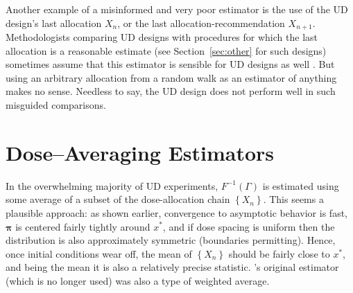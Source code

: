 Another example of a misinformed and very poor estimator is the use of the UD design's last allocation $X_n$, or the last allocation-recommendation $X_{n+1}$.  Methodologists comparing UD designs with procedures for which the last allocation is a reasonable estimate (see Section~\ref{sec:other} for such designs) sometimes assume that this estimator is sensible for UD designs as well \citep{O'Qu:Chev:meth:1991,Zack:stag:2009}. But using an arbitrary allocation from a random walk as an estimator of anything makes no sense. Needless to say, the UD design does not perform well in such misguided comparisons.

\section{Dose--Averaging Estimators}\label{sec:averaging}

In the overwhelming majority of UD experiments, $F^{-1}(\Gamma)$ is estimated using some average of a subset of the dose-allocation chain $\left\{X_n\right\}$. This seems a plausible approach: as shown earlier, convergence to asymptotic behavior is fast, $\boldsymbol{\pi}$ is centered fairly tightly around $x^*$, and if dose spacing is uniform then the distribution is also approximately symmetric (boundaries permitting). Hence, once initial conditions wear off, the mean of $\left\{X_n\right\}$ should be fairly close to $x^*$, and being the mean it is also a relatively precise statistic. \cite{Dixo:Mood:Amet:1948}'s original estimator (which is no longer used) was also a type of weighted average.

